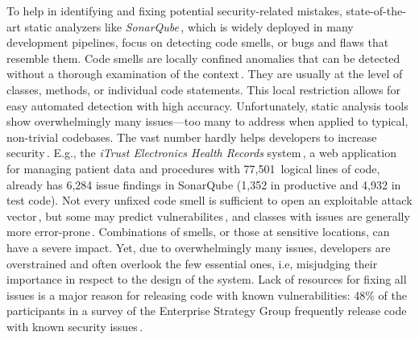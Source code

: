 To help in identifying and fixing potential security-related mistakes, state-of-the-art static analyzers like \emph{SonarQube}\,\cite{sonar}, which is widely deployed in many development pipelines, focus on detecting code smells, or bugs and flaws that resemble them.
Code smells are locally confined anomalies that can be detected without a thorough examination of the context\,\cite{peldszus2016continuous}. They are usually at the level of classes, methods, or individual code statements.
This local restriction allows for easy automated detection with high accuracy.
Unfortunately, static analysis tools show overwhelmingly many issues---too many to address when applied to typical, non-trivial codebases.
The vast number hardly helps developers to increase security\,\cite{Walden2014}.
E.g., the \emph{iTrust Electronics Health Records} system\,\cite{heckman2018}, a web application for managing patient data and procedures with 77,501~logical lines of code,
already has 6,284 issue findings in SonarQube (1,352 in productive and 4,932 in test code).
%
Not every unfixed code smell is sufficient to open an exploitable attack vector\,\cite{Walden2014}, but some may predict vulnerabilites\,\cite{8819456,9359268}, and classes with issues are generally more error-prone\,\cite{FV15}.
Combinations of smells, or those at sensitive locations, can have a severe impact.
Yet,
due to overwhelmingly many issues, developers are overstrained and often overlook the few essential ones, i.e, %
misjudging
their importance in respect to the design of the system.
Lack of resources for fixing all issues is a major reason for releasing code with known vulnerabilities:
48\% of the participants in a survey of the Enterprise Strategy Group frequently release code with known security issues\,\cite{Gruber2020}.


